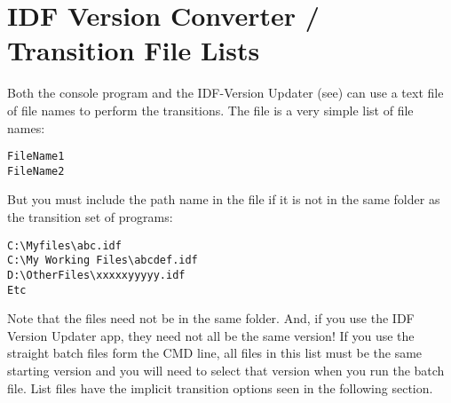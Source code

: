 \section{IDF Version Converter / Transition File Lists}\label{idf-version-converter-transition-file-lists}

Both the console program and the IDF-Version Updater (see) can use a text file of file names to perform the transitions. The file is a very simple list of file names:

\begin{lstlisting}
FileName1
FileName2
\end{lstlisting}

But you must include the path name in the file if it is not in the same folder as the transition set of programs:

\begin{lstlisting}
C:\Myfiles\abc.idf
C:\My Working Files\abcdef.idf
D:\OtherFiles\xxxxxyyyyy.idf
Etc
\end{lstlisting}

Note that the files need not be in the same folder. And, if you use the IDF Version Updater app, they need not all be the same version! If you use the straight batch files form the CMD line, all files in this list must be the same starting version and you will need to select that version when you run the batch file. List files have the implicit transition options seen in the following section.
